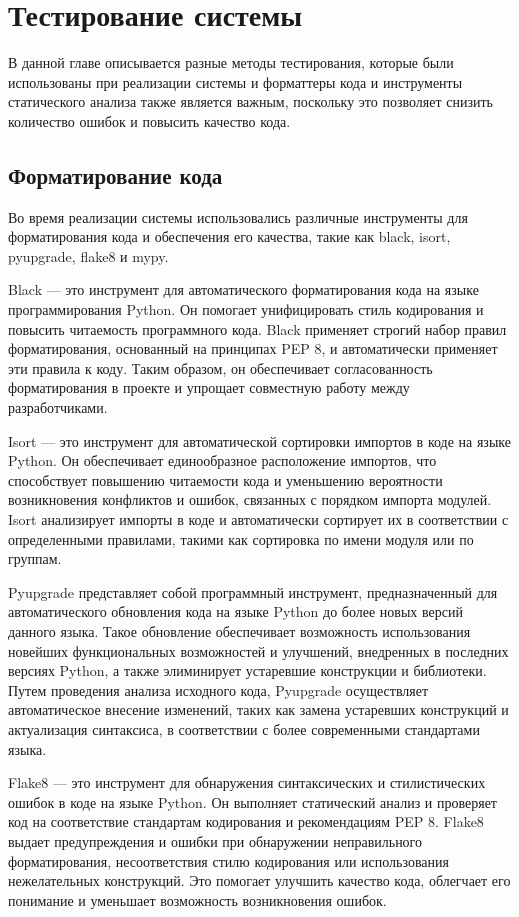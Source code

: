 \documentclass[PI, VKR]{HSEUniversity}
\begin{document}
\chapter{Тестирование системы}
\label{sec:org8876b0c}
В данной главе описывается разные методы тестирования, которые были использованы при реализации системы и форматтеры кода и инструменты статического анализа также является важным, поскольку это позволяет снизить количество ошибок и повысить качество кода.
\section{Форматирование кода}
\label{sec:orgcb243ca}
Во время реализации системы использовались различные инструменты для форматирования кода и обеспечения его качества, такие как black, isort, pyupgrade, flake8 и mypy.

Black — это инструмент для автоматического форматирования кода на языке программирования Python. Он помогает унифицировать стиль кодирования и повысить читаемость программного кода. Black применяет строгий набор правил форматирования, основанный на принципах PEP 8, и автоматически применяет эти правила к коду. Таким образом, он обеспечивает согласованность форматирования в проекте и упрощает совместную работу между разработчиками.

Isort — это инструмент для автоматической сортировки импортов в коде на языке Python. Он обеспечивает единообразное расположение импортов, что способствует повышению читаемости кода и уменьшению вероятности возникновения конфликтов и ошибок, связанных с порядком импорта модулей. Isort анализирует импорты в коде и автоматически сортирует их в соответствии с определенными правилами, такими как сортировка по имени модуля или по группам.

Pyupgrade представляет собой программный инструмент, предназначенный для автоматического обновления кода на языке Python до более новых версий данного языка. Такое обновление обеспечивает возможность использования новейших функциональных возможностей и улучшений, внедренных в последних версиях Python, а также элиминирует устаревшие конструкции и библиотеки. Путем проведения анализа исходного кода, Pyupgrade осуществляет автоматическое внесение изменений, таких как замена устаревших конструкций и актуализация синтаксиса, в соответствии с более современными стандартами языка.

Flake8 — это инструмент для обнаружения синтаксических и стилистических ошибок в коде на языке Python. Он выполняет статический анализ и проверяет код на соответствие стандартам кодирования и рекомендациям PEP 8. Flake8 выдает предупреждения и ошибки при обнаружении неправильного форматирования, несоответствия стилю кодирования или использования нежелательных конструкций. Это помогает улучшить качество кода, облегчает его понимание и уменьшает возможность возникновения ошибок.
\end{document}
